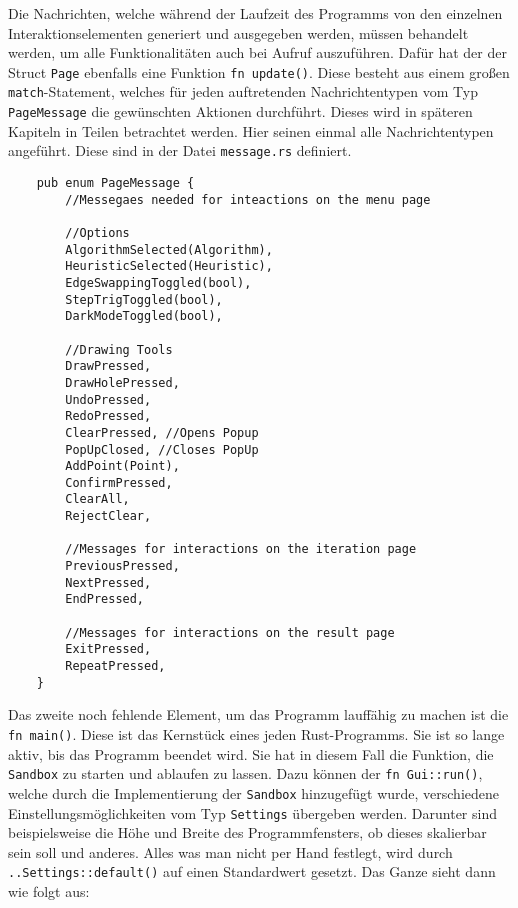 Die Nachrichten, welche während der Laufzeit des Programms von den einzelnen Interaktionselementen generiert und ausgegeben werden, müssen behandelt werden, um alle Funktionalitäten auch bei Aufruf auszuführen.
Dafür hat der der Struct \lstinline{Page} ebenfalls eine Funktion \lstinline{fn update()}. Diese besteht aus einem großen \lstinline{match}-Statement, welches für jeden auftretenden Nachrichtentypen vom Typ \lstinline{PageMessage} die gewünschten 
Aktionen durchführt. Dieses wird in späteren Kapiteln in Teilen betrachtet werden. Hier seinen einmal alle Nachrichtentypen angeführt. Diese sind in der Datei \lstinline{message.rs} definiert.

\begin{lstlisting}
    pub enum PageMessage {
        //Messegaes needed for inteactions on the menu page
        
        //Options
        AlgorithmSelected(Algorithm),
        HeuristicSelected(Heuristic),
        EdgeSwappingToggled(bool),
        StepTrigToggled(bool),
        DarkModeToggled(bool),
    
        //Drawing Tools
        DrawPressed,
        DrawHolePressed,
        UndoPressed,
        RedoPressed,
        ClearPressed, //Opens Popup
        PopUpClosed, //Closes PopUp
        AddPoint(Point),
        ConfirmPressed,
        ClearAll,
        RejectClear,
        
        //Messages for interactions on the iteration page
        PreviousPressed,
        NextPressed,
        EndPressed,
    
        //Messages for interactions on the result page
        ExitPressed,
        RepeatPressed,
    }
\end{lstlisting}

Das zweite noch fehlende Element, um das Programm lauffähig zu machen ist die \lstinline{fn main()}. Diese ist das Kernstück eines jeden Rust-Programms. Sie ist so lange aktiv, bis das Programm beendet wird.
Sie hat in diesem Fall die Funktion, die \lstinline{Sandbox} zu starten und ablaufen zu lassen. Dazu können der \lstinline{fn Gui::run()}, welche durch die Implementierung der \lstinline{Sandbox} hinzugefügt wurde, verschiedene 
Einstellungsmöglichkeiten vom Typ \lstinline{Settings} übergeben werden. Darunter sind beispielsweise die Höhe und Breite des Programmfensters, ob dieses skalierbar sein soll und anderes. Alles was man nicht per Hand festlegt,
wird durch \lstinline{..Settings::default()} auf einen Standardwert gesetzt. Das Ganze sieht dann wie folgt aus: 


